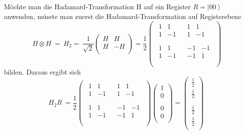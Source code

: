 Möchte man die Hadamard-Transformation H auf ein Register $R=\left|00\right\rangle$ anwenden, müsste man zuerst die Hadamard-Transformation auf Registerebene 
$$H\otimes H\ =\ H_2=\ \frac{1}{\sqrt2}\left(\begin{matrix}H&H\\H&-H\\\end{matrix}\right)=\frac{1}{2}\left(\begin{matrix}\begin{matrix}1&1\\1&-1\\\end{matrix}&\begin{matrix}1&1\\1&-1\\\end{matrix}\\\begin{matrix}1&1\\1&-1\\\end{matrix}&\begin{matrix}-1&-1\\-1&1\\\end{matrix}\\\end{matrix}\right)$$
bilden. Daraus ergibt sich
$$H_2R\ =\frac{1}{2}\left(\begin{matrix}\begin{matrix}1&1\\1&-1\\\end{matrix}&\begin{matrix}1&1\\1&-1\\\end{matrix}\\\begin{matrix}1&1\\1&-1\\\end{matrix}&\begin{matrix}-1&-1\\-1&1\\\end{matrix}\\\end{matrix}\right)\binom{\begin{matrix}1\\0\\\end{matrix}}{\begin{matrix}0\\0\\\end{matrix}}=\binom{\begin{matrix}\frac{1}{2}\\\frac{1}{2}\\\end{matrix}}{\begin{matrix}\frac{1}{2}\\\frac{1}{2}\\\end{matrix}}\ $$
